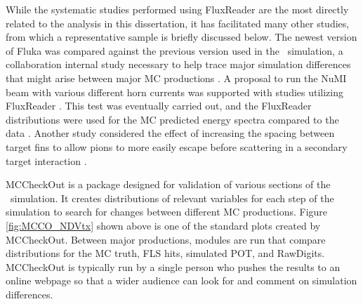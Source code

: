 While the systematic studies performed using FluxReader are the most directly related to the analysis in this dissertation, it has facilitated many other studies, from which a representative sample is briefly discussed below. The newest version of Fluka was compared against the previous version used in the \nova~simulation, a collaboration internal study necessary to help trace major simulation differences that might arise between major MC productions \cite{ref:FRFluka}. A proposal to run the NuMI beam with various different horn currents was supported with studies utilizing FluxReader \cite{ref:FRHornProposal}. This test was eventually carried out, and the FluxReader distributions were used for the MC predicted energy spectra compared to the data \cite{ref:FRHornResult}. Another study considered the effect of increasing the spacing between target fins to allow pions to more easily escape before scattering in a secondary target interaction \cite{ref:FRTarget}.

MCCheckOut is a package designed for validation of various sections of the \nova~simulation. It creates distributions of relevant variables for each step of the simulation to search for changes between different MC productions. Figure \ref{fig:MCCO_NDVtx} shown above is one of the standard plots created by MCCheckOut. Between major productions, modules are run that compare distributions for the MC truth, FLS hits, simulated POT, and RawDigits. MCCheckOut is typically run by a single person who pushes the results to an online webpage so that a wider audience can look for and comment on simulation differences. 

